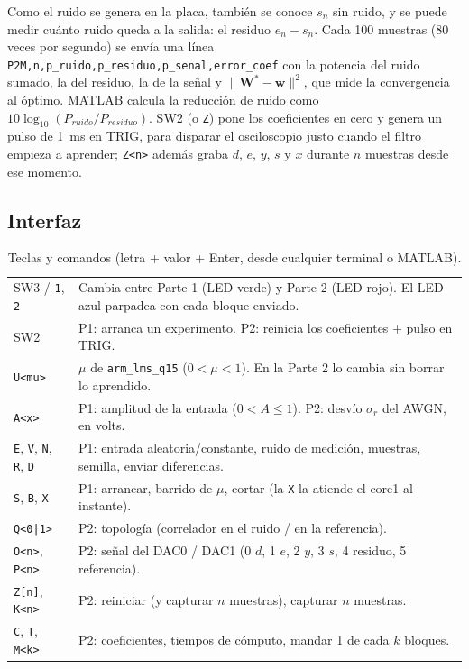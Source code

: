 \documentclass[11pt,a4paper]{article}
\newcommand{\lmsq}{\texttt{arm\_lms\_q15}}
\begin{document}
Como el ruido se genera en la placa, también se conoce $s_n$ sin ruido, y se puede medir cuánto
ruido queda a la salida: el residuo $e_n - s_n$. Cada 100 muestras (80 veces por segundo) se envía
una línea \texttt{P2M,n,p\_ruido,p\_residuo,p\_senal,error\_coef} con la potencia del ruido
sumado, la del residuo, la de la señal y $\|\mathbf{W}^*-\mathbf{w}\|^2$, que mide la
convergencia al óptimo. MATLAB calcula la reducción de ruido como
$10\log_{10}(P_{ruido}/P_{residuo})$. SW2 (o \texttt{Z}) pone los coeficientes en cero y genera un
pulso de 1~ms en TRIG, para disparar el osciloscopio justo cuando el filtro empieza a aprender;
\texttt{Z<n>} además graba $d$, $e$, $y$, $s$ y $x$ durante $n$ muestras desde ese momento.

\subsection{Interfaz}
\begin{table}[H]
\centering
\caption{Teclas y comandos (letra + valor + Enter, desde cualquier terminal o MATLAB).}
\small
\begin{tabular}{lp{11cm}}
\toprule
SW3 / \texttt{1}, \texttt{2} & Cambia entre Parte 1 (LED verde) y Parte 2 (LED rojo). El LED azul parpadea con cada bloque enviado. \\
SW2 & P1: arranca un experimento. P2: reinicia los coeficientes + pulso en TRIG. \\
\texttt{U<mu>} & $\mu$ de \lmsq{} ($0 < \mu < 1$). En la Parte 2 lo cambia sin borrar lo aprendido. \\
\texttt{A<x>} & P1: amplitud de la entrada ($0 < A \le 1$). P2: desvío $\sigma_r$ del AWGN, en volts. \\
\texttt{E}, \texttt{V}, \texttt{N}, \texttt{R}, \texttt{D} & P1: entrada aleatoria/constante, ruido de medición, muestras, semilla, enviar diferencias. \\
\texttt{S}, \texttt{B}, \texttt{X} & P1: arrancar, barrido de $\mu$, cortar (la \texttt{X} la atiende el core1 al instante). \\
\texttt{Q<0|1>} & P2: topología (correlador en el ruido / en la referencia). \\
\texttt{O<n>}, \texttt{P<n>} & P2: señal del DAC0 / DAC1 (0 $d$, 1 $e$, 2 $y$, 3 $s$, 4 residuo, 5 referencia). \\
\texttt{Z[n]}, \texttt{K<n>} & P2: reiniciar (y capturar $n$ muestras), capturar $n$ muestras. \\
\texttt{C}, \texttt{T}, \texttt{M<k>} & P2: coeficientes, tiempos de cómputo, mandar 1 de cada $k$ bloques. \\
\bottomrule
\end{tabular}
\end{table}
\end{document}
